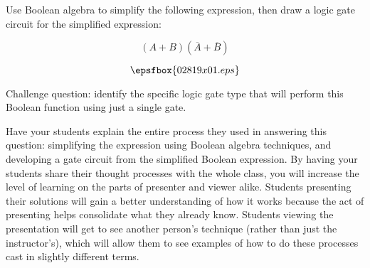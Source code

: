 

Use Boolean algebra to simplify the following expression, then draw a logic gate circuit for the simplified expression:

$$(A + B)(\overline{A} + \overline{B})$$







$$\epsfbox{02819x01.eps}$$

\vskip 10pt

Challenge question: identify the specific logic gate type that will perform this Boolean function using just a single gate.







Have your students explain the entire process they used in answering this question: simplifying the expression using Boolean algebra techniques, and developing a gate circuit from the simplified Boolean expression.  By having your students share their thought processes with the whole class, you will increase the level of learning on the parts of presenter and viewer alike.  Students presenting their solutions will gain a better understanding of how it works because the act of presenting helps consolidate what they already know.  Students viewing the presentation will get to see another person's technique (rather than just the instructor's), which will allow them to see examples of how to do these processes cast in slightly different terms.





